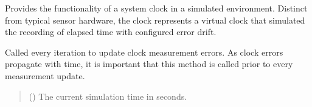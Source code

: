 \documentclass[letterpaper,10pt,english]{sphinxmanual}
\begin{document}
\begin{fulllineitems}
\label{\detokenize{modules/measurement/clock:qnav.measurement.clock.Clock}}
\pysigstartsignatures
{}
\pysigstopsignatures
\sphinxAtStartPar
Provides the functionality of a system clock in a simulated environment.
Distinct from typical sensor hardware, the clock represents a virtual
clock that simulated the recording of elapsed time with configured error drift.

\begin{fulllineitems}
\label{\detokenize{modules/measurement/clock:qnav.measurement.clock.Clock.update}}
\pysigstartsignatures
{}
\pysigstopsignatures
\sphinxAtStartPar
Called every iteration to update clock measurement errors.
As clock errors propagate with time, it is important that this
method is called prior to every measurement update.
\begin{quote}\begin{description}
\sphinxAtStartPar
{} () \textendash{} The current simulation time in seconds.

\end{description}\end{quote}

\end{fulllineitems}



\end{fulllineitems}
\end{document}
